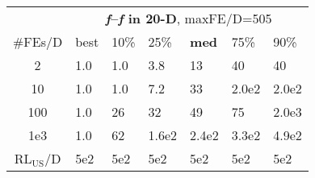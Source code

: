 \begin{tabular}{c|llllll}
 & \multicolumn{6}{|c}{\textbf{\textit{f}\raisebox{-0.35ex}{1}--\textit{f}\raisebox{-0.35ex}{24} in 20-D}, maxFE/D=505}\\
\#FEs/D & best & 10\% & 25\% & \textbf{med} & 75\% & 90\%\\
2 & \hspace*{1ex}1.0 & \hspace*{1ex}1.0 & \hspace*{1ex}3.8 & 13 & 40 & 40\\
10 & \hspace*{1ex}1.0 & \hspace*{1ex}1.0 & \hspace*{1ex}7.2 & 33 & 2.0e2 & 2.0e2\\
100 & \hspace*{1ex}1.0 & 26 & 32 & 49 & 75 & 2.0e3\\
1e3 & \hspace*{1ex}1.0 & 62 & 1.6e2 & 2.4e2 & 3.3e2 & 4.9e2\\
$\text{RL}_{\text{US}}$/D & 5e2 & 5e2 & 5e2 & 5e2 & 5e2 & 5e2
\end{tabular}

